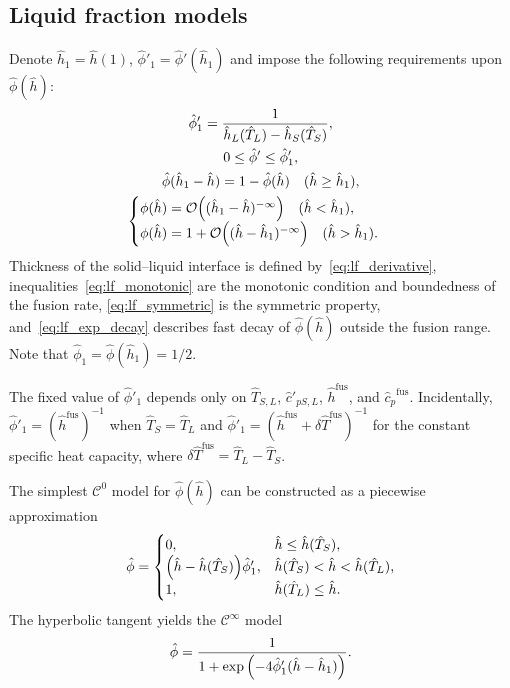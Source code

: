 \documentclass{article}
\newcommand{\fusion}[1]{{#1}^\mathrm{fus}}
\newcommand{\Hh}{\hat{h}}
\newcommand{\HT}{\hat{T}}
\newcommand{\Hc}{\hat{c}}
\newcommand{\Hphi}{\hat{\phi}}
\begin{document}
\subsection{Liquid fraction models}

Denote \(\Hh_1 = \Hh(1)\), \(\Hphi'_1 = \Hphi'(\Hh_1)\) and
impose the following requirements upon \(\Hphi(\Hh)\):
\begin{gather}
    \Hphi'_1 = \frac1{\Hh_L(\HT_L)-\Hh_S(\HT_S)}, \label{eq:lf_derivative}\\
    0 \leq \Hphi' \leq \Hphi'_1, \label{eq:lf_monotonic}\\
    \Hphi(\Hh_1 - \Hh) = 1-\Hphi(\Hh) \quad (\Hh\geq\Hh_1), \label{eq:lf_symmetric}\\
    \begin{cases}
        \phi(\Hh) = \order{(\Hh_1-\Hh)^{-\infty}} \quad (\Hh < \Hh_1), \\
        \phi(\Hh) = 1+\order{(\Hh-\Hh_1)^{-\infty}} \quad (\Hh > \Hh_1).
    \end{cases}\label{eq:lf_exp_decay}
\end{gather}
Thickness of the solid--liquid interface is defined by~\eqref{eq:lf_derivative},
inequalities~\eqref{eq:lf_monotonic} are the monotonic condition and boundedness of the fusion rate,
\eqref{eq:lf_symmetric} is the symmetric property,
and~\eqref{eq:lf_exp_decay} describes fast decay of \(\Hphi(\Hh)\) outside the fusion range.
Note that \(\Hphi_1 = \Hphi(\Hh_1) = 1/2\).

The fixed value of \(\Hphi'_1\) depends only on \(\HT_{S,L}\), \(\Hc'_{pS,L}\), \(\fusion{\Hh}\), and \(\fusion{\Hc_p}\).
Incidentally, \(\Hphi'_1 = (\fusion{\Hh})^{-1}\) when \(\HT_S=\HT_L\)
and \(\Hphi'_1 = (\fusion{\Hh}+\delta\fusion{\HT})^{-1}\) for the constant specific heat capacity,
where \(\delta\fusion{\HT} = \HT_L - \HT_S\).

The simplest \(\mathcal{C}^0\) model for \(\Hphi(\Hh)\) can be constructed as a piecewise approximation
\begin{equation}\label{eq:lf_piecewise}
    \Hphi = \begin{cases}
        0,                                            & \Hh \leq \Hh(\HT_S), \\
        \qty(\Hh-\Hh(\HT_S))\Hphi'_1, & \Hh(\HT_S) < \Hh < \Hh(\HT_L), \\
        1,                                            & \Hh(\HT_L) \leq \Hh.
    \end{cases}
\end{equation}
The hyperbolic tangent yields the \(\mathcal{C}^\infty\) model
\begin{equation}\label{eq:lf_tanh}
    \Hphi = \frac1{1+\exp\qty(-4\Hphi'_1(\Hh-\Hh_1))}.
\end{equation}
\end{document}

